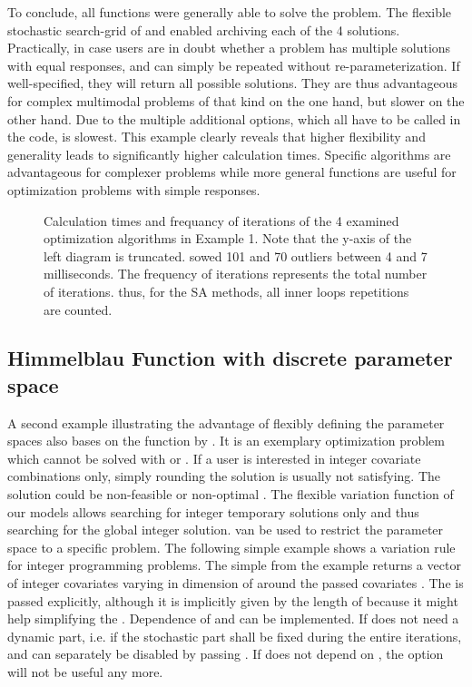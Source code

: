 To conclude, all functions were generally able to solve the problem. The flexible stochastic search-grid of  and  enabled archiving each of the 4 solutions. Practically, in case users are in doubt whether a problem has multiple solutions with equal responses,  and  can simply be repeated without re-parameterization. If well-specified, they will return all possible solutions. They are thus advantageous for complex multimodal problems of that kind on the one hand, but slower on the other hand. Due to the multiple additional options, which all have to be called in the code,  is slowest. This example clearly reveals that higher flexibility and generality leads to significantly higher calculation times. Specific algorithms are advantageous for complexer problems while more general functions are useful for optimization problems with simple responses.

\begin{figure}[htbp]
	\centering
	\resizebox{1.04\linewidth}{!}{}
	\caption{Calculation times and frequancy of iterations of the 4 examined optimization algorithms in Example 1. Note that the y-axis of the left diagram is truncated.  sowed 101 and  70 outliers between 4 and 7 milliseconds. The frequency of iterations represents the total number of iterations. thus, for the SA methods, all inner loops repetitions are counted.}
	\label{fig:fig1}
\end{figure}


\subsection{Himmelblau Function with discrete parameter space}
A second example illustrating the advantage of flexibly defining the parameter spaces also bases on the function by \citet{himmelblau_1972}. It is an exemplary optimization problem which cannot be solved with  or . If a user is interested in integer covariate combinations only, simply rounding the solution is usually not satisfying. The solution could be non-feasible or non-optimal \citep{cardoso_1997}. The flexible variation function  of our models allows searching for integer temporary solutions only and thus searching for the global integer solution.  van be used to restrict the parameter space to a specific problem. The following simple example shows a variation rule for integer programming problems. The simple  from the example returns a vector of integer covariates varying in dimension of  around the passed covariates . The  is passed explicitly, although it is implicitly given by the length of  because it might help simplifying the . Dependence of  and  can be implemented. If  does not need a dynamic part, i.e. if the stochastic part shall be fixed during the entire iterations,  and  can separately be disabled by passing . If  does not depend on , the option  will not be useful any more.

